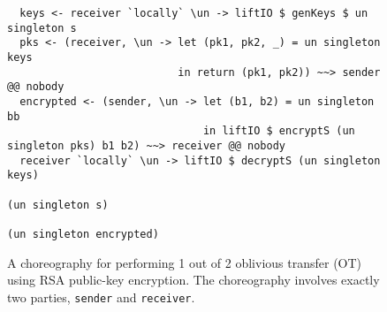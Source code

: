 \documentclass[sigplan,screen,review,anonymous]{acmart}
\newcommand{\inlinecode}[2][haskell]{\texttt{#2}}
\begin{document}
\begin{figure*}
\begin{mdframed}
\begin{verbatim}
  keys <- receiver `locally` \un -> liftIO $ genKeys $ un singleton s
  pks <- (receiver, \un -> let (pk1, pk2, _) = un singleton keys
                           in return (pk1, pk2)) ~~> sender @@ nobody
  encrypted <- (sender, \un -> let (b1, b2) = un singleton bb
                               in liftIO $ encryptS (un singleton pks) b1 b2) ~~> receiver @@ nobody
  receiver `locally` \un -> liftIO $ decryptS (un singleton keys)
                                                           (un singleton s)
                                                           (un singleton encrypted)
\end{verbatim}
\caption{A choreography for performing 1 out of 2 oblivious transfer (OT) using RSA public-key encryption. The choreography involves exactly two parties, \inlinecode{sender} and \inlinecode{receiver}.}
\label{fig:oblivious-transfer}
\end{mdframed}
\end{figure*}
\end{document}
